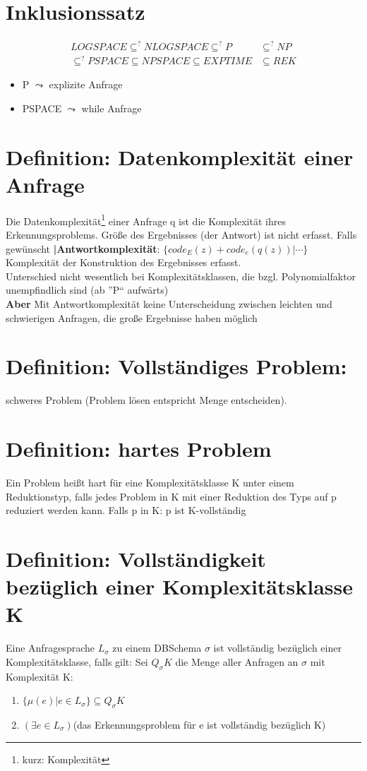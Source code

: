 \documentclass[12pt, a4paper]{article}
\begin{document}
\section*{Inklusionssatz}

\begin{align*}
LOGSPACE \subseteq^? NLOGSPACE \subseteq^? P &\subseteq^? NP  \\
\subseteq^? PSPACE \subseteq NPSPACE \subseteq EXPTIME &\subseteq REK
\end{align*}

\begin{itemize}
\item P $\leadsto$ explizite Anfrage
\item PSPACE $\leadsto$ while Anfrage
\end{itemize}

\section*{Definition: Datenkomplexität einer Anfrage}
Die Datenkomplexität\footnote{kurz: Komplexität} einer Anfrage q ist die Komplexität ihres Erkennungsproblems. Größe des Ergebnisses (der Antwort) ist nicht erfasst. Falls gewünscht \textbf{|Antwortkomplexität}: $\{ code_E(z) + code_e(q(z))  | \cdots \}$ Komplexität der Konstruktion des Ergebnisses erfasst. \\
Unterschied nicht wesentlich bei Komplexitätsklassen, die bzgl. Polynomialfaktor unempfindlich sind (ab ''P`` aufwärts) \\

\textbf{Aber} Mit Antwortkomplexität keine Unterscheidung zwischen leichten und schwierigen Anfragen, die große Ergebnisse haben möglich

\section*{Definition: Vollständiges Problem:} schweres Problem (Problem lösen entspricht Menge entscheiden).

\section*{Definition: hartes Problem} Ein Problem heißt hart für eine Komplexitätsklasse K unter einem Reduktionstyp, falls jedes Problem in K mit einer Reduktion des Typs auf p reduziert werden kann. Falls p in K: p ist K-vollständig

\section*{Definition: Vollständigkeit bezüglich einer Komplexitätsklasse K} Eine Anfragesprache $L_\sigma$ zu einem DBSchema $\sigma$ ist vollständig bezüglich einer Komplexitätsklasse, falls gilt: 
Sei $Q_\sigma K$ die Menge aller Anfragen an $\sigma$ mit Komplexität K:
\begin{enumerate}
	\item $\{ \mu(e) | e \in L_\sigma \} \subseteq Q_\sigma K$
	\item $(\exists e \in L_\sigma)$(das Erkennungsproblem für e ist vollständig bezüglich K)
\end{enumerate}
\end{document}
